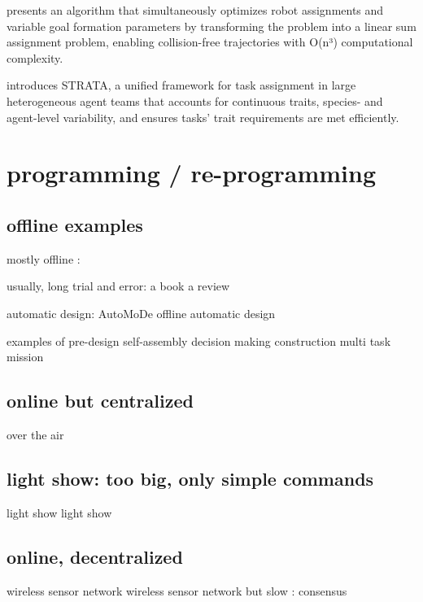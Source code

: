 \cite{agarwal2018simultaneous} presents an algorithm that simultaneously optimizes robot assignments and variable goal formation parameters by transforming the problem into a linear sum assignment problem, enabling collision-free trajectories with O(n³) computational complexity.

\cite{ravichandar2020strata} introduces STRATA, a unified framework for task assignment in large heterogeneous agent teams that accounts for continuous traits, species- and agent-level variability, and ensures tasks' trait requirements are met efficiently.

\section{programming / re-programming}

\subsection {offline examples}

mostly offline :

usually, long trial and error: 
\cite{hamann2018swarm} a book
\cite{brambilla2013swarm} a review

automatic design:
\cite{francesca2014automode} AutoMoDe
\cite{francesca2016automatic}
\cite{birattari2019automatic} offline automatic design

examples of pre-design
\cite{rubenstein2014programmable} self-assembly
\cite{valentini2016collective} decision making
\cite{werfel2014designing} construction
\cite{dorigo2013swarmanoid} multi task mission

\subsection {online but centralized}
\cite{zyrianoff2024over} over the air
\cite{abadie2024robotap}

\subsection {light show: too big, only simple commands}
\cite{waibel2017drone} light show
\cite{ang2018high} light show

\subsection {online, decentralized}
\cite{xie2011design} wireless sensor network
\cite{wang2006reprogramming} wireless sensor network
but slow : consensus
\cite{de2009energy}
\cite{varadharajan2018over} 



